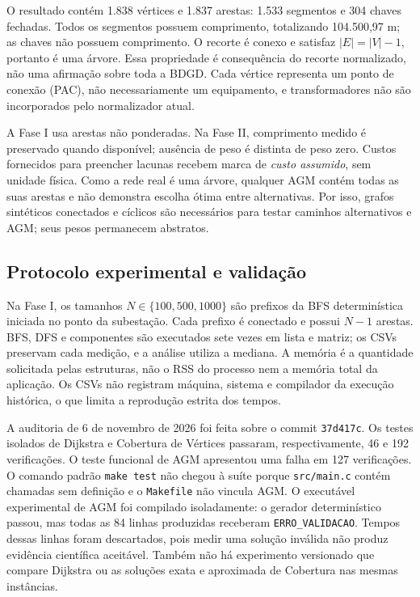 \documentclass[12pt]{article}
\begin{document}
O resultado contém 1.838 vértices e 1.837 arestas: 1.533 segmentos e 304 chaves fechadas. Todos os segmentos possuem comprimento, totalizando 104.500,97 m; as chaves não possuem comprimento. O recorte é conexo e satisfaz $|E|=|V|-1$, portanto é uma árvore. Essa propriedade é consequência do recorte normalizado, não uma afirmação sobre toda a BDGD. Cada vértice representa um ponto de conexão (PAC), não necessariamente um equipamento, e transformadores não são incorporados pelo normalizador atual.

A Fase I usa arestas não ponderadas. Na Fase II, comprimento medido é preservado quando disponível; ausência de peso é distinta de peso zero. Custos fornecidos para preencher lacunas recebem marca de \emph{custo assumido}, sem unidade física. Como a rede real é uma árvore, qualquer AGM contém todas as suas arestas e não demonstra escolha ótima entre alternativas. Por isso, grafos sintéticos conectados e cíclicos são necessários para testar caminhos alternativos e AGM; seus pesos permanecem abstratos.

\subsection{Protocolo experimental e validação}

Na Fase I, os tamanhos $N\in\{100,500,1000\}$ são prefixos da BFS determinística iniciada no ponto da subestação. Cada prefixo é conectado e possui $N-1$ arestas. BFS, DFS e componentes são executados sete vezes em lista e matriz; os CSVs preservam cada medição, e a análise utiliza a mediana. A memória é a quantidade solicitada pelas estruturas, não o RSS do processo nem a memória total da aplicação. Os CSVs não registram máquina, sistema e compilador da execução histórica, o que limita a reprodução estrita dos tempos.

A auditoria de 6 de novembro de 2026 foi feita sobre o commit \texttt{37d417c}. Os testes isolados de Dijkstra e Cobertura de Vértices passaram, respectivamente, 46 e 192 verificações. O teste funcional de AGM apresentou uma falha em 127 verificações. O comando padrão \texttt{make test} não chegou à suíte porque \texttt{src/main.c} contém chamadas sem definição e o \texttt{Makefile} não vincula AGM. O executável experimental de AGM foi compilado isoladamente: o gerador determinístico passou, mas todas as 84 linhas produzidas receberam \texttt{ERRO\_VALIDACAO}. Tempos dessas linhas foram descartados, pois medir uma solução inválida não produz evidência científica aceitável. Também não há experimento versionado que compare Dijkstra ou as soluções exata e aproximada de Cobertura nas mesmas instâncias.
\end{document}

